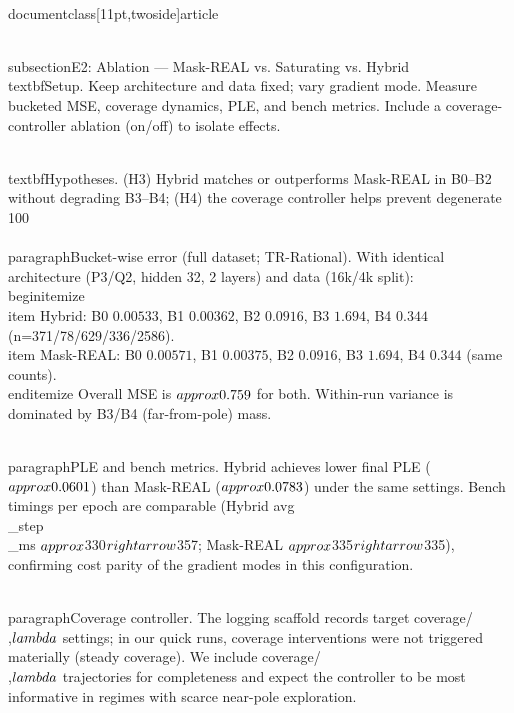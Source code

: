 \\documentclass[11pt,twoside]{article}
\begin{document}
\\subsection{E2: Ablation --- Mask-REAL vs. Saturating vs. Hybrid}
\\textbf{Setup.} Keep architecture and data fixed; vary gradient mode. Measure bucketed MSE, coverage dynamics, PLE, and bench metrics. Include a coverage-controller ablation (on/off) to isolate effects.

\\textbf{Hypotheses.} (H3) Hybrid matches or outperforms Mask-REAL in B0--B2 without degrading B3--B4; (H4) the coverage controller helps prevent degenerate 100\\%

\\paragraph{Bucket-wise error (full dataset; TR-Rational).} With identical architecture (P3/Q2, hidden 32, 2 layers) and data (16k/4k split):
\\begin{itemize}
  \\item Hybrid: B0 $0.00533$, B1 $0.00362$, B2 $0.0916$, B3 $1.694$, B4 $0.344$ (n=371/78/629/336/2586).
  \\item Mask-REAL: B0 $0.00571$, B1 $0.00375$, B2 $0.0916$, B3 $1.694$, B4 $0.344$ (same counts).
\\end{itemize}
Overall MSE is $\\approx0.759$ for both. Within-run variance is dominated by B3/B4 (far-from-pole) mass.

\\paragraph{PLE and bench metrics.} Hybrid achieves lower final PLE ($\\approx0.0601$) than Mask-REAL ($\\approx0.0783$) under the same settings. Bench timings per epoch are comparable (Hybrid avg\\_step\\_ms $\\approx$330$\\rightarrow$357; Mask-REAL $\\approx$335$\\rightarrow$335), confirming cost parity of the gradient modes in this configuration.

\\paragraph{Coverage controller.} The logging scaffold records target coverage/\\,$\\lambda$ settings; in our quick runs, coverage interventions were not triggered materially (steady coverage). We include coverage/\\,$\\lambda$ trajectories for completeness and expect the controller to be most informative in regimes with scarce near-pole exploration.
\end{document}
